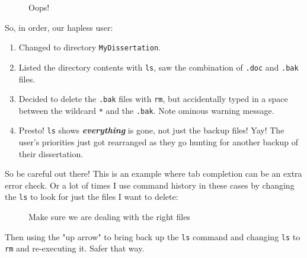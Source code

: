 \documentclass[10pt,american,]{book}
\newenvironment{Shaded}{\begin{snugshade}}{\end{snugshade}}
\newcommand{\KeywordTok}[1]{\textcolor[rgb]{0.13,0.29,0.53}{\textbf{{#1}}}}
\newcommand{\NormalTok}[1]{{#1}}
\numberwithin{figure}{chapter}
\DeclareRobustCommand{\drcap}[1]{\begin{figure}[H]\caption{#1}\end{figure}}
\renewcommand{\KeywordTok}[1]{{#1}}
\renewcommand{\NormalTok}[1]{{#1}}
\begin{document}
\drcap{Oops!}

\begin{Shaded}
\end{Shaded}

So, in order, our hapless user:

\begin{enumerate}
\def\labelenumi{\arabic{enumi}.}
\item
  Changed to directory \texttt{MyDissertation}.
\item
  Listed the directory contents with \texttt{ls}, saw the combination of
  \texttt{.doc} and \texttt{.bak} files.
\item
  Decided to delete the \texttt{.bak} files with \texttt{rm}, but
  accidentally typed in a space between the wildcard \texttt{*} and the
  \texttt{.bak}. Note ominous warning message.
\item
  Presto! \texttt{ls} shows \textbf{\emph{everything}} is gone, not just
  the backup files! Yay! The user's priorities just got rearranged as
  they go hunting for another backup of their dissertation.
\end{enumerate}

So be careful out there! This is an example where tab completion can be
an extra error check. Or a lot of times I use command history in these
cases by changing the \texttt{ls} to look for just the files I want to
delete:

\drcap{Make sure we are dealing with the right files}

\begin{Shaded}
\end{Shaded}

Then using the "up arrow" to bring back up the \texttt{ls} command and
changing \texttt{ls} to \texttt{rm} and re-executing it. Safer that way.
\end{document}
